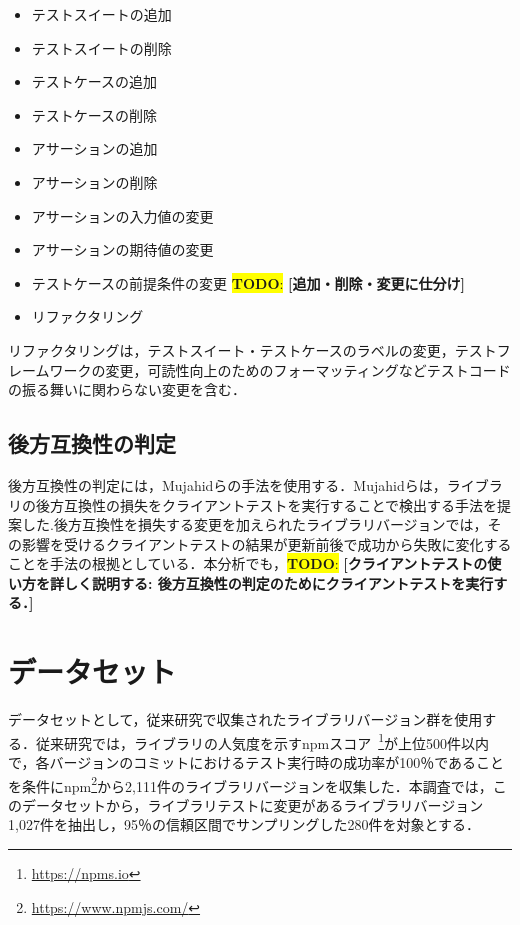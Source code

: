 \documentclass[11pt,dvipdfmx]{jreport}
\newcommand{\todo}[1]{\colorbox{yellow}{{\bf TODO}:}{\color{red} {\textbf{[#1]}}}}
\begin{document}
\begin{itemize}
  \setlength{\itemsep}{0cm}
  \item テストスイートの追加
  \item テストスイートの削除
  \item テストケースの追加
  \item テストケースの削除
  \item アサーションの追加
  \item アサーションの削除
  \item アサーションの入力値の変更
  \item アサーションの期待値の変更
  \item テストケースの前提条件の変更 \todo{追加・削除・変更に仕分け}
  \item リファクタリング
\end{itemize}

リファクタリングは，テストスイート・テストケースのラベルの変更，テストフレームワークの変更，可読性向上のためのフォーマッティングなどテストコードの振る舞いに関わらない変更を含む．

\subsection{後方互換性の判定}\label{kouhougokanseinohantei}
後方互換性の判定には，Mujahidらの手法を使用する．Mujahidらは，ライブラリの後方互換性の損失をクライアントテストを実行することで検出する手法を提案した\cite{mujahid}.後方互換性を損失する変更を加えられたライブラリバージョンでは，その影響を受けるクライアントテストの結果が更新前後で成功から失敗に変化することを手法の根拠としている．本分析でも，\todo{クライアントテストの使い方を詳しく説明する: 後方互換性の判定のためにクライアントテストを実行する．}

\section{データセット}
データセットとして，従来研究\cite{matsuda}で収集されたライブラリバージョン群を使用する．従来研究では，ライブラリの人気度を示すnpmスコア~\footnote{\url{https://npms.io}}が上位500件以内で，各バージョンのコミットにおけるテスト実行時の成功率が100％であることを条件にnpm\footnote{\url{https://www.npmjs.com/}}から2,111件のライブラリバージョンを収集した．本調査では，このデータセットから，ライブラリテストに変更があるライブラリバージョン1,027件を抽出し，95％の信頼区間でサンプリングした280件を対象とする．
\end{document}
